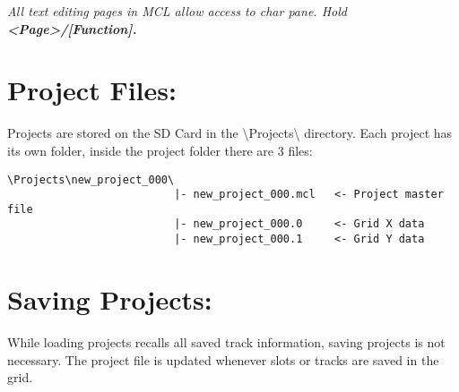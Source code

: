 \textit{All text editing pages in MCL allow access to char pane. Hold \textbf{<Page>/[Function].}}

\section{Project Files:}
Projects are stored on the SD Card in the \textbackslash{}Projects\textbackslash{} directory.
Each project has its own folder, inside the project folder there are 3 files:
\begin{verbatim}
\Projects\new_project_000\
                          |- new_project_000.mcl   <- Project master file
                          |- new_project_000.0     <- Grid X data
                          |- new_project_000.1     <- Grid Y data
\end{verbatim}

\section{Saving Projects:}
While loading projects recalls all saved track information, saving projects is not necessary. The project file is updated whenever slots or tracks are saved in the grid.